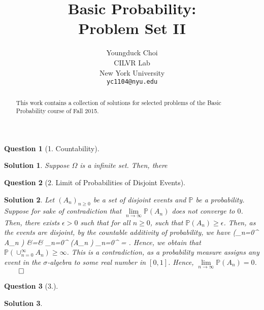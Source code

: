 \documentclass{article} %
\title{Basic Probability: \\
Problem Set II}
\author{
Youngduck Choi \\
CILVR Lab \\
New York University\\
\texttt{yc1104@nyu.edu} \\
}
\def\eQb#1\eQe{\begin{eqnarray*}#1\end{eqnarray*}}
\theoremstyle{quest}
\newtheorem*{question}{Question}
\newtheorem*{solution}{Solution}
\begin{document}
\maketitle

\begin{abstract}
This work contains a collection of solutions for selected problems 
of the Basic Probability course of Fall 2015.
\end{abstract}

\begin{question}[1. Countability]
\end{question}
\begin{solution}
Suppose $\Omega$ is a infinite set. Then, there 
\end{solution}

\bigskip

\begin{question}[2. Limit of Probabilities of Disjoint Events]
\end{question}
\begin{solution}
Let $( A_n )_{n \geq 0}$ be a set of disjoint events and $\mathbb{P}$ be a probability.
Suppose for sake of contradiction that $\underset{n \to \infty}{\lim} \mathbb{P}(A_n )$
does not converge to $0$. Then, there exists $\epsilon > 0$ such that for all $n \geq 0$,
such that $\mathbb{P}(A_n ) \geq \epsilon$. Then, 
as the events are disjoint, by the countable additivity of probability,
we have 
\eQb
\mathbb{P}(\cup_{n=0}^{\infty} A_n ) &=& \sum_{n=0}^{\infty} (A_n ) 
\geq \sum_{n=0}^{\infty} \epsilon = \infty. 
\eQe
Hence, we obtain that $\mathbb{P}(\cup_{n=0}^{\infty} A_n) \geq \infty$. This is a contradiction,
as a probability measure assigns any event in the $\sigma$-algebra to some real number in $[0,1]$.
Hence, $\underset{n \to \infty}{\lim} \mathbb{P}(A_n) = 0$. $\qed$
\end{solution}

\bigskip

\begin{question}[3.]
\end{question}
\begin{solution}
\end{solution}

\bigskip
\end{document}
